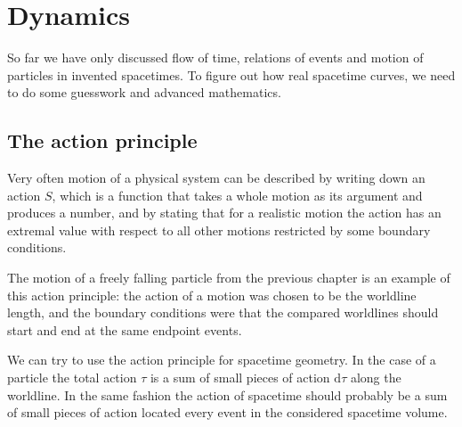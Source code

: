 \documentclass[11pt,oneside%
]{memoir}
\newenvironment{eqna}{\begin{IEEEeqnarray*}{c}}{\end{IEEEeqnarray*}\ignorespacesafterend}
\newcommand{\andd}{\qquad\textrm{and}\qquad}
\newcommand{\dd}{\mathrm{d}}
\begin{document}
%
%





\chapter{Dynamics}

So far we have only discussed flow of time, relations of events and motion of particles in invented spacetimes. To figure out how real spacetime curves, we need to do some guesswork and advanced mathematics.

\section{The action principle}

Very often motion of a physical system can be described by writing down an action \(S\), which is a function that takes a whole motion as its argument and produces a number, and by stating that for a realistic motion the action has an extremal value with respect to all other motions restricted by some boundary conditions.

The motion of a freely falling particle from the previous chapter is an example of this action principle: the action of a motion was chosen to be the worldline length, and the boundary conditions were that the compared worldlines should start and end at the same endpoint events.

We can try to use the action principle for spacetime geometry. In the case of a particle the total action \(\tau\) is a sum of small pieces of action \(\dd\tau\) along the worldline. In the same fashion the action of spacetime should probably be a sum of small pieces of action located every event in the considered spacetime volume.
\end{document}
